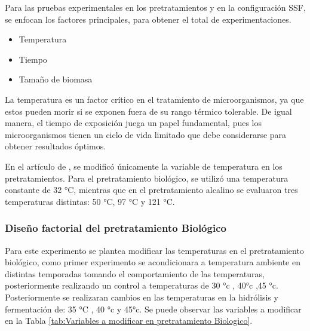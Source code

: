 \documentclass[12pt]{article}
\begin{document}
		Para las pruebas experimentales en los pretratamientos y en la configuración SSF, se enfocan los factores principales, para obtener el total de experimentaciones.
		
		
		\begin{itemize}
			\item Temperatura
			\item Tiempo
			\item Tamaño de biomasa
		\end{itemize}
		
		
		La temperatura es un factor crítico en el tratamiento de microorganismos, ya que estos pueden morir si se exponen fuera de su rango térmico tolerable. De igual manera, el tiempo de exposición juega un papel fundamental, pues los microorganismos tienen un ciclo de vida limitado que debe considerarse para obtener resultados óptimos.
		
		En el artículo de \cite{Arturo2022evaluacion}, se modificó únicamente la variable de temperatura en los pretratamientos. Para el pretratamiento biológico, se utilizó una temperatura constante de 32 °C, mientras que en el pretratamiento alcalino se evaluaron tres temperaturas distintas: 50 °C, 97 °C y 121 °C.
		

		
		
		\subsubsection{Diseño factorial del pretratamiento Biológico}
		
		\label{Diseño factorial del pretratamiento Biologico}
		
		
		Para este experimento se plantea modificar las temperaturas en el pretratamiento biológico, como primer experimento se acondicionara a temperatura ambiente en distintas temporadas tomando el comportamiento de las temperaturas, posteriormente realizando un control a temperaturas de 30 °c , 40°c ,45 °c. Posteriormente se realizaran cambios en las temperaturas  en la hidrólisis y fermentación de: 35 °C , 40 °c y 45°c. Se puede observar las variables a modificar en la Tabla \ref{tab:Variables a modificar en pretratamiento Biologico}.
		
\end{document}
